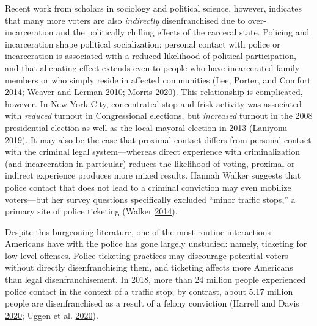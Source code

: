 \documentclass[
  12pt,
]{article}
\begin{document}
Recent work from scholars in sociology and political science, however, indicates that many more voters are also \emph{indirectly} disenfranchised due to over-incarceration and the politically chilling effects of the carceral state. Policing and incarceration shape political socialization: personal contact with police or incarceration is associated with a reduced likelihood of political participation, and that alienating effect extends even to people who have incarcerated family members or who simply reside in affected communities (Lee, Porter, and Comfort \protect\hyperlink{ref-Lee2014}{2014}; Weaver and Lerman \protect\hyperlink{ref-Weaver2010}{2010}; Morris \protect\hyperlink{ref-Morris2020}{2020}). This relationship is complicated, however. In New York City, concentrated stop-and-frisk activity was associated with \emph{reduced} turnout in Congressional elections, but \emph{increased} turnout in the 2008 presidential election as well as the local mayoral election in 2013 (Laniyonu \protect\hyperlink{ref-Laniyonu2019}{2019}). It may also be the case that proximal contact differs from personal contact with the criminal legal system---whereas direct experience with criminalization (and incarceration in particular) reduces the likelihood of voting, proximal or indirect experience produces more mixed results. Hannah Walker suggests that police contact that does not lead to a criminal conviction may even mobilize voters---but her survey questions specifically excluded ``minor traffic stops,'' a primary site of police ticketing (Walker \protect\hyperlink{ref-Walker2014}{2014}).

Despite this burgeoning literature, one of the most routine interactions Americans have with the police has gone largely unstudied: namely, ticketing for low-level offenses. Police ticketing practices may discourage potential voters without directly disenfranchising them, and ticketing affects more Americans than legal disenfranchisement. In 2018, more than 24 million people experienced police contact in the context of a traffic stop; by contrast, about 5.17 million people are disenfranchised as a result of a felony conviction (Harrell and Davis \protect\hyperlink{ref-Harrell2020}{2020}; Uggen et al. \protect\hyperlink{ref-Uggen2020}{2020}).
\end{document}
